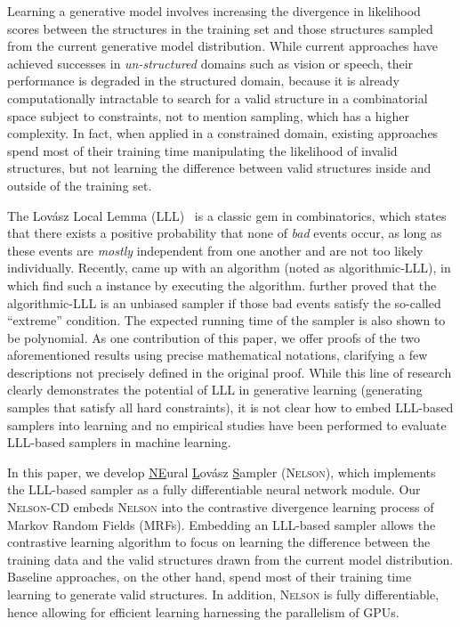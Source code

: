 \documentclass[letterpaper]{article} %
\newcommand{\lovasz}{{Lov\'asz}\xspace}
\newcommand{\nls}{\textsc{Nelson}\xspace}
\begin{document}
Learning a generative model involves increasing the divergence in likelihood scores between the structures in the training set and those structures sampled from the current generative model distribution. 
%
While current approaches have achieved successes in \textit{un-structured} domains such as vision or speech, their performance is degraded in the structured domain, because it is already computationally intractable to search for a valid structure in a combinatorial space subject to constraints, not to mention sampling, which has a higher complexity.
%
%
%
In fact, when applied in a constrained domain, existing approaches spend most of their training time manipulating the likelihood of invalid structures, but not learning the difference between valid structures inside and outside of the training set. 
%

The \lovasz Local Lemma (LLL)~\cite{erdHos1973problems} is a classic gem in combinatorics, which states that there exists a positive probability that none of \textit{bad} events occur, as long as these events are \textit{mostly} independent from one another and are not too likely individually. 
%
Recently, \citet{DBLP:journals/jacm/MoserT10} came up with an algorithm (noted as algorithmic-LLL), in which find such a instance by executing the algorithm.
%
\citet{DBLP:journals/jacm/GuoJL19} further proved that the algorithmic-LLL is an unbiased sampler if those bad events satisfy the so-called ``extreme'' condition. 
The expected running time of the sampler is also shown to be polynomial. 
%
As one contribution of this paper, we offer proofs of the two aforementioned results using precise mathematical notations, clarifying a few descriptions not precisely defined in the original proof. 
%
While this line of research clearly demonstrates the potential of LLL in generative learning (generating samples that satisfy all hard constraints), it is not clear how to embed LLL-based samplers into learning and no empirical studies have been performed to evaluate LLL-based samplers in machine learning. 

In this paper, we develop   \underline{NE}ural \underline{L}ov\'asz \underline{S}ampler (\nls), which implements the LLL-based sampler as a fully differentiable neural network module. 
%
Our \nls-CD embeds \nls 
into the contrastive divergence learning process of Markov Random Fields (MRFs). 
%
%
%
Embedding an LLL-based sampler allows the contrastive learning algorithm to focus on learning the difference between the training data and the valid structures drawn from the current model distribution. Baseline approaches, on the other hand, spend most of their training time learning to generate valid structures. 
%
In addition, \nls is fully differentiable, hence allowing for efficient learning harnessing the parallelism of GPUs. 
\end{document}

